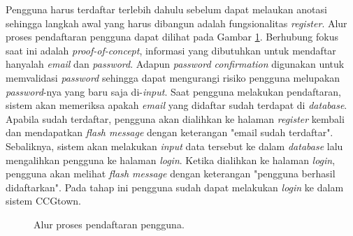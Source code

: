 Pengguna harus terdaftar terlebih dahulu sebelum dapat melaukan anotasi sehingga
langkah awal yang harus dibangun adalah fungsionalitas \textit{register}.
Alur proses pendaftaran pengguna dapat dilihat pada Gambar \ref{flowchart:register}.
Berhubung fokus saat ini adalah \textit{proof-of-concept}, informasi yang dibutuhkan
untuk mendaftar hanyalah \textit{email} dan \textit{password}. Adapun
\textit{password confirmation} digunakan untuk memvalidasi \textit{password}
sehingga dapat mengurangi risiko pengguna melupakan
\textit{password}-nya yang baru saja di-\textit{input}.
Saat pengguna melakukan pendaftaran, sistem akan memeriksa apakah \textit{email} yang
didaftar sudah terdapat di \textit{database}.
Apabila sudah terdaftar, pengguna akan dialihkan ke halaman \textit{register} kembali
dan mendapatkan \textit{flash message} dengan keterangan "email sudah terdaftar".
Sebaliknya, sistem akan melakukan \textit{input} data tersebut ke dalam \textit{database}
lalu mengalihkan pengguna ke halaman \textit{login}.
Ketika dialihkan ke halaman \textit{login}, pengguna akan melihat \textit{flash message}
dengan keterangan "pengguna berhasil didaftarkan".
Pada tahap ini pengguna sudah dapat melakukan \textit{login} ke dalam sistem CCGtown.

\begin{figure}\centering\small
	\caption{Alur proses pendaftaran pengguna.}
  \label{flowchart:register}
\end{figure}


